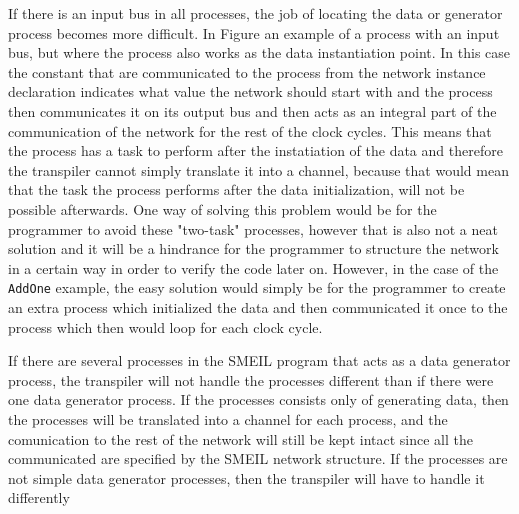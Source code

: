 If there is an input bus in all processes, the job of locating the data or generator process becomes more difficult. In Figure %
an example of a process with an input bus, but where the process also works as the data instantiation point. In this case the constant that are communicated to the process from the network instance declaration indicates what value the network should start with and the process then communicates it on its output bus and then acts as an integral part of the communication of the network for the rest of the clock cycles. This means that the process has a task to perform after the instatiation of the data and therefore the transpiler cannot simply translate it into a \cspm channel, because that would mean that the task the process performs after the data initialization, will not be possible afterwards. One way of solving this problem would be for the programmer to avoid these "two-task" processes, however that is also not a neat solution and it will be a hindrance for the programmer to structure the network in a certain way in order to verify the code later on. However, in the case of the \texttt{AddOne} example, the easy solution would simply be for the programmer to create an extra process which initialized the data and then communicated it once to the process which then would loop for each clock cycle.

If there are several processes in the SMEIL program that acts as a data generator process, the transpiler will not handle the processes different than if there were one data generator process. If the processes consists only of generating data, then the processes will be translated into a \cspm channel for each process, and the comunication to the rest of the network will still be kept intact since all the communicated are specified by the SMEIL network structure.
If the processes are not simple data generator processes, then the transpiler will have to handle it differently %



